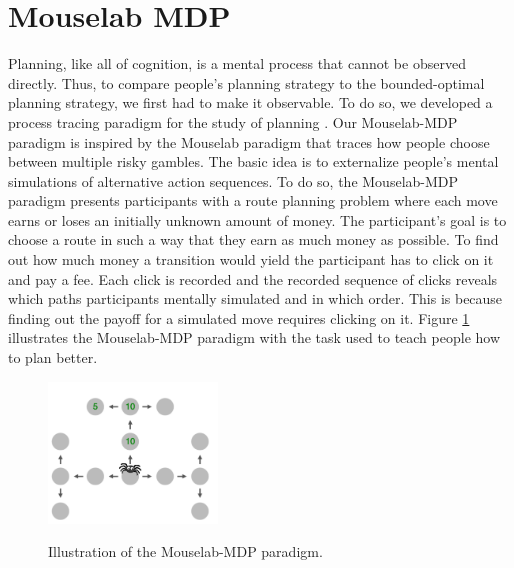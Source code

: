
\section{Mouselab MDP}
\label{sec:mouselab_mdp}

Planning, like all of cognition, is a mental process that cannot be observed directly. Thus, to compare people's planning strategy to the bounded-optimal planning strategy, we first had to make it observable. To do so, we developed a process tracing paradigm for the study of planning \cite{CallawayLiederKrueger2017}. Our Mouselab-MDP paradigm is inspired by the Mouselab paradigm \citep{Payne1993} that traces how people choose between multiple risky gambles. The basic idea is to externalize people's mental simulations of alternative action sequences. To do so, the Mouselab-MDP paradigm presents participants with a route planning problem where each move earns or loses an initially unknown amount of money. The participant's goal is to choose a route in such a way that they earn as much money as possible. To find out how much money a transition would yield the participant has to click on it and pay a fee. Each click is recorded and the recorded sequence of clicks reveals which paths participants mentally simulated and in which order. This is because finding out the payoff for a simulated move requires clicking on it. Figure \ref{fig:MouselabMDP} illustrates the Mouselab-MDP paradigm with the task used to teach people how to plan better.

\begin{figure}
    \centering
    \includegraphics[width=0.4\textwidth]{figures/web-of-cash.png}
    \label{fig:MouselabMDP}
    \caption{Illustration of the Mouselab-MDP paradigm.}
\end{figure}
